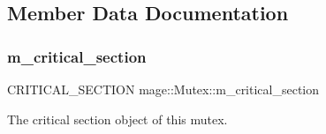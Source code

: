 \subsection{Member Data Documentation}
\hypertarget{structmage_1_1_mutex_a18414337aef28b7ed261e7a805d2c103}{}\label{structmage_1_1_mutex_a18414337aef28b7ed261e7a805d2c103} 
\subsubsection{\texorpdfstring{m\+\_\+critical\+\_\+section}{m\_critical\_section}}
{\footnotesize\ttfamily C\+R\+I\+T\+I\+C\+A\+L\+\_\+\+S\+E\+C\+T\+I\+ON mage\+::\+Mutex\+::m\+\_\+critical\+\_\+section\hspace{0.3cm}{\ttfamily [private]}}

The critical section object of this mutex. 